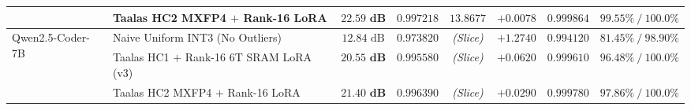 \documentclass[10pt,journal,compsoc]{IEEEtran}
\def\texttt#1{#1}%
\def\textbf#1{#1}%
\begin{document}
\begin{table}[!t]
{\begin{tabular}{llcccccc}
 & \textbf{Taalas HC2 \texttt{MXFP4} $+$ Rank-16 LoRA} & $\mathbf{22.59\text{ dB}}$ & $\mathbf{0.997218}$ & $\mathbf{13.8677}$ & $\mathbf{+0.0078}$ & $\mathbf{0.999864}$ & $\mathbf{99.55\%\ /\ 100.0\%}$ \\
\midrule
\multirow{3}{*}{\texttt{Qwen2.5-Coder-7B}} & Naive Uniform \texttt{INT3} (No Outliers) & $12.84\text{ dB}$ & $0.973820$ & \emph{(Slice)} & $+1.2740$ & $0.994120$ & $81.45\%\ /\ 98.90\%$ \\
 & \textbf{Taalas HC1 $+$ Rank-16 $6\text{T}$ SRAM LoRA (\texttt{v3})} & $\mathbf{20.55\text{ dB}}$ & $\mathbf{0.995580}$ & \emph{(Slice)} & $\mathbf{+0.0620}$ & $\mathbf{0.999610}$ & $\mathbf{96.48\%\ /\ 100.0\%}$ \\
 & \textbf{Taalas HC2 \texttt{MXFP4} $+$ Rank-16 LoRA} & $\mathbf{21.40\text{ dB}}$ & $\mathbf{0.996390}$ & \emph{(Slice)} & $\mathbf{+0.0290}$ & $\mathbf{0.999780}$ & $\mathbf{97.86\%\ /\ 100.0\%}$ \\
\bottomrule
\end{tabular}}
\end{table}
\end{document}

